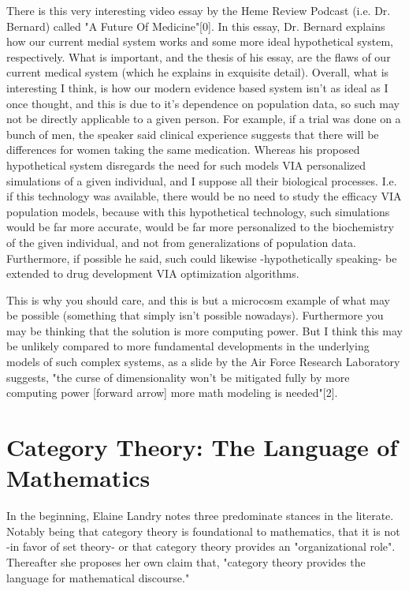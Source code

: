 There is this very interesting video essay by the Heme Review Podcast (i.e.  Dr. Bernard) called "A Future Of Medicine"[0]. In this essay, Dr. Bernard explains how our current medial system works and some more ideal hypothetical system, respectively. What is important, and the thesis of his essay, are the flaws of our current medical system (which he explains in exquisite detail). Overall, what is interesting I think, is how our modern evidence based system isn’t as ideal as I once thought, and this is due to it’s dependence on population data, so such may not be directly applicable to a given person. For example, if a trial was done on a bunch of men, the speaker said clinical experience suggests that there will be differences for women taking the same medication. Whereas his proposed hypothetical system disregards the need for such models VIA personalized simulations of a given individual, and I suppose all their biological processes. I.e. if this technology was available, there would be no need to study the efficacy VIA population models, because with this hypothetical technology, such simulations would be far more accurate, would be far more personalized to the biochemistry of the given individual, and not from generalizations of population data. Furthermore, if possible he said, such could likewise -hypothetically speaking- be extended to drug development VIA optimization algorithms.

This is why you should care, and this is but a microcosm example of what may be possible (something that simply isn't possible nowadays). Furthermore you may be thinking that the solution is more computing power. But I think this may be unlikely compared to more fundamental developments in the underlying models of such complex systems, as a slide by the Air Force Research Laboratory suggests, "the curse of dimensionality won’t be mitigated fully by more computing power [forward arrow] more math modeling is needed"[2].


\section*{Category Theory: The Language of Mathematics}

In the beginning, Elaine Landry notes three predominate stances in the literate. Notably being that category theory is foundational to mathematics, that it is not -in favor of set theory- or that category theory provides an "organizational role".  Thereafter she proposes her own claim that, "category theory provides the language for mathematical discourse."

